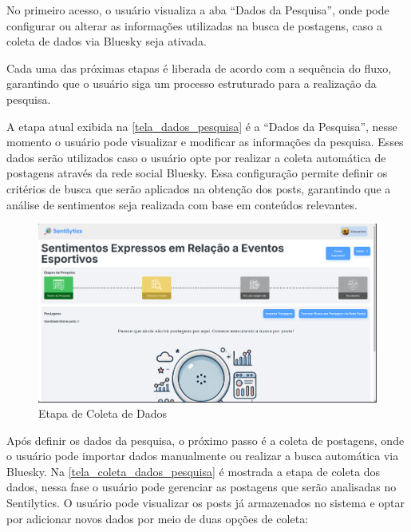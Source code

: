\documentclass[
	12pt,				%
	oneside,			%
	a4paper,			%
	english,			%
	french,				%
	spanish,			%
	brazil				%
	]{abntex2}
\begin{document}
No primeiro acesso, o usuário visualiza a aba ``Dados da Pesquisa'',
onde pode configurar ou alterar as informações utilizadas na busca de
postagens, caso a coleta de dados via Bluesky seja ativada.

Cada uma das próximas etapas é liberada de acordo com a sequência do
fluxo, garantindo que o usuário siga um processo estruturado para a
realização da pesquisa.

A etapa atual exibida na \autoref{tela_dados_pesquisa} é a ``Dados da
Pesquisa'', nesse momento o usuário pode visualizar e modificar as
informações da pesquisa. Esses dados serão utilizados caso o usuário
opte por realizar a coleta automática de postagens através da rede
social Bluesky. Essa configuração permite definir os critérios de busca
que serão aplicados na obtenção dos posts, garantindo que a análise de
sentimentos seja realizada com base em conteúdos relevantes.

\begin{figure}[htbp]
\hypertarget{tela_coleta_dados_pesquisa}{%
\caption{Etapa de Coleta de Dados}\label{tela_coleta_dados_pesquisa}
\begin{center}
\includegraphics[scale=0.2]{imagens/sentilytics/interface-grafica/coleta-dados.png}
\end{center}
}
\end{figure}

Após definir os dados da pesquisa, o próximo passo é a coleta de
postagens, onde o usuário pode importar dados manualmente ou realizar a
busca automática via Bluesky. Na \autoref{tela_coleta_dados_pesquisa} é
mostrada a etapa de coleta dos dados, nessa fase o usuário pode
gerenciar as postagens que serão analisadas no Sentilytics. O usuário
pode visualizar os posts já armazenados no sistema e optar por adicionar
novos dados por meio de duas opções de coleta:
\end{document}

